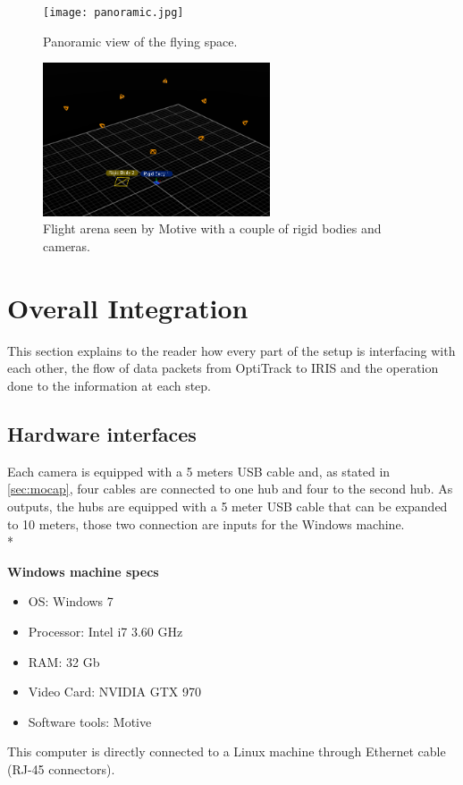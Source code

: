 \begin{figure}[h]
\centering
 \texttt{[image: panoramic.jpg]}
 \caption[Flight arena panoramic]{Panoramic view of the flying space.}
 \label{figure:arenapano}
\end{figure}

\begin{figure}[h]
	\centering
	\includegraphics[width=0.6\textwidth]{motiv_panorama.PNG}
	\caption[Flight arena from motive]{Flight arena seen by Motive with a couple of rigid bodies and cameras.}
	\label{figure:arenamotive}
\end{figure}



\section{Overall Integration}
\label{sec:integration}

This section explains to the reader how every part of the setup is interfacing with each other, the flow of data packets from OptiTrack to IRIS and the operation done to the information at each step.

\subsection{Hardware interfaces}

Each camera is equipped with a 5 meters USB cable and, as stated in \ref{sec:mocap}, four cables are connected to one hub and four to the second hub. As outputs, the hubs are equipped with a 5 meter USB cable that can be expanded to 10 meters, those two connection are inputs for the Windows machine. \\*

\noindent
\textbf{Windows machine specs} 
\begin{itemize}

\item OS: Windows 7 
\item Processor: Intel i7 3.60 GHz
\item RAM: 32 Gb
\item Video Card: NVIDIA GTX 970
\item Software tools: Motive

\end{itemize}
This computer is directly connected to a Linux machine through Ethernet cable (RJ-45 connectors). \\

